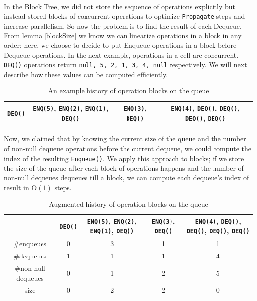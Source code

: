 \documentclass[10pt]{article}
\theoremstyle{definition}
\begin{document}
\paragraph{}
In the Block Tree, we did not store the sequence of operations explicitly but instead stored blocks of concurrent operations to optimize \texttt{Propagate} steps and increase parallelism. So now the problem is to find the result of each Dequeue. From lemma \ref{blockSize} we know we can linearize operations in a block in any order; here, we choose to decide to put Enqueue operations in a block before Dequeue operations. In the next example, operations in a cell are concurrent. \texttt{DEQ()} operations return \texttt{null, 5, 2, 1, 3, 4, null} respectively. We will next describe how these values can be computed efficiently.

\begin{table}[hbt]
\centering
  \begin{tabular}{c|c|c|c}
    \hline \texttt{DEQ()} & \texttt{ENQ(5)}, \texttt{ENQ(2)}, \texttt{ENQ(1)}, \texttt{DEQ()}& \texttt{ENQ(3)}, \texttt{DEQ()}&  \texttt{ENQ(4)}, \texttt{DEQ()}, \texttt{DEQ()}, \texttt{DEQ()}, \texttt{DEQ()}\\ \hline
  \end{tabular}
  \caption{An example history of operation blocks on the queue}
\end{table}


\paragraph{}
Now, we claimed that by knowing the current size of the queue and the number of non-null dequeue operations before the current dequeue, we could compute the index of the resulting \texttt{Enqueue()}. We apply this approach to blocks; if we store the size of the queue after each block of operations happens and the number of non-null dequeues dequeues till a block, we can compute each dequeue's index of result in \textsc{O}$(1)$ steps.

\begin{table}[hbt]
\centering
  \begin{tabular}{c|c|c|c|c}
    \hline &\texttt{DEQ()} & \texttt{ENQ(5)}, \texttt{ENQ(2)}, \texttt{ENQ(1)}, \texttt{DEQ()}& \texttt{ENQ(3)}, \texttt{DEQ()}&  \texttt{ENQ(4)}, \texttt{DEQ()}, \texttt{DEQ()}, \texttt{DEQ()}, \texttt{DEQ()}\\ \hline
    \#enqueues & 0 & 3 & 1 & 1 \\ \hline
        \#dequeues & 1 & 1 & 1 & 4 \\ \hline
            \#non-null dequeues & 0 & 1 & 2 & 5 \\ \hline
                size & 0 & 2 & 2 & 0 \\ \hline
  \end{tabular}
  \caption{Augmented history of operation blocks on the queue}
\end{table}
\end{document}
